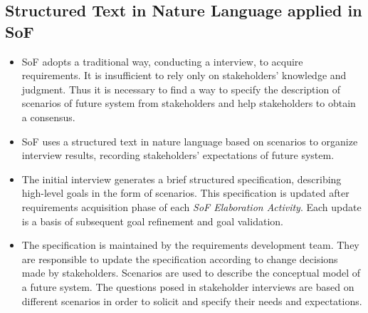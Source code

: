 ﻿\documentclass{beamer}
\begin{document}
\subsection{Structured Text in Nature Language applied in SoF}
\begin{frame}              %
  \footnotesize{
    \begin{itemize}
    \item SoF adopts a traditional way, conducting a interview, to acquire requirements. It is insufficient to rely only on stakeholders' knowledge and judgment. Thus it is necessary to find a way to specify the description of scenarios of future system from stakeholders and help stakeholders to obtain a consensus.  \pause
    \item SoF uses a structured text in nature language based on scenarios to organize interview results, recording stakeholders' expectations of future system.\pause
    \item 
      The initial interview generates a brief structured specification, describing high-level goals in the form of scenarios. This specification is updated after requirements acquisition phase of each \emph{SoF Elaboration Activity}. Each update is a basis of subsequent goal refinement and goal validation.\pause
    \item 
      The specification is maintained by the requirements development team. They are responsible to update the specification according to change decisions made by stakeholders. Scenarios are used to describe the conceptual model of a future system. The questions posed in stakeholder interviews are based on different scenarios in order to solicit and specify their needs and expectations.\pause
    \end{itemize}
  }
\end{frame}
\end{document}
